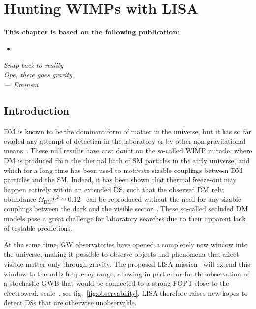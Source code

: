 \chapter{Hunting WIMPs with LISA}\label{chp:LISA}

\begin{tcolorbox}[colframe=DESYcyan, colback=DESYcyan!10]
	\textbf{This chapter is based on the following publication:}
	\begin{itemize}[leftmargin=17pt]
		\item[\cite{Bringmann:2023iuz}] 
	\end{itemize}
\end{tcolorbox}
\vspace{0.5cm}

\begin{flushright}
	\slshape
	Snap back to reality\\
	Ope, there goes gravity\\ \medskip
	--- Eminem
\end{flushright}


\section{Introduction}
\label{sec:introduction}

\Acf{DM} is known to be the dominant form of matter in the universe, but it has so far evaded any attempt of detection in the laboratory or by other non-gravitational means~\cite{ParticleDataGroup:2022pth}. These null results have cast doubt on the so-called \ac{WIMP} miracle, where \ac{DM} is produced from the thermal bath of \ac{SM} particles in the early universe, and which for a long time has been used to motivate sizable couplings between \ac{DM} particles and the \ac{SM}. Indeed, it has been shown that thermal freeze-out may happen entirely within an extended \ac{DS}, such that the observed \ac{DM}  relic abundance $\Omega_\text{DM} h^2 \simeq 0.12$~\cite{Planck:2018vyg} can be reproduced without the need for any sizable couplings between the dark and the visible sector~\cite{Pospelov:2007mp}. These so-called secluded \ac{DM} models pose a great challenge for laboratory searches due to their apparent lack of testable predictions.

At the same time, \ac{GW} observatories have opened a completely new window into the universe, making it possible to observe objects and phenomena that affect visible matter only through gravity. The proposed \ac{LISA} mission~\cite{LISA:2017pwj} will extend this window to the mHz frequency range, allowing in particular for the  observation of a stochastic \ac{GWB} that would be connected to a strong \ac{FOPT} close to the electroweak scale~\cite{Caprini:2015zlo, Caprini:2018mtu, Caprini:2019egz}, see fig.~\ref{fig:observability}. \ac{LISA} therefore raises new hopes to detect \acp{DS} that are otherwise unobservable.


